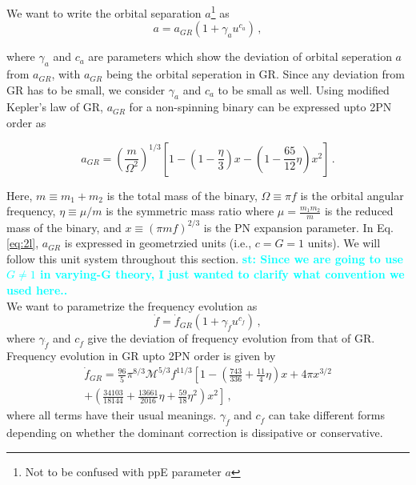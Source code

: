 \documentclass[11pt]{article}
\newcommand{\st}[1]{\textcolor{cyan}{\textbf{st: #1}} }
\begin{document}
 \hspace*{15.5pt}We want to write the orbital separation $a$\footnote{Not to be confused with ppE parameter $a$} as
 \begin{equation}
 \label{eq:2k}
 a=a_{GR}(1+\gamma_a u^{c_a})\,,
 \end{equation}

 where $\gamma_a$ and $c_a$ are parameters which show the deviation of orbital seperation $a$ from $a_{GR}$, with $a_{GR}$ being the orbital seperation in GR. Since any deviation from GR has to be small, we consider $\gamma_a$ and $c_a$ to be small as well. Using modified Kepler's law of GR, $a_{GR}$ for a non-spinning binary can be expressed upto 2PN order as \cite{Blanchet:1995ez} \cite{Blanchet:2013haa}
 
 \begin{equation}\label{eq:2l}
 a_{GR}=\left(\frac{m}{\Omega^2}\right)^{1/3}\left[1-\left(1-\frac{\eta}{3}\right)x-\left(1-\frac{65}{12}\eta\right)x^2\right]\,.
 \end{equation}
 
 Here, $m\equiv m_1+m_2$ is the total mass of the binary, $\Omega\equiv\pi f $ is the orbital angular frequency, $\eta\equiv\mu/m$ is the symmetric mass ratio where $\mu=\frac{m_1m_2}{m}$ is the reduced mass of the binary, and $x\equiv (\pi m f)^{2/3}$ is the PN expansion parameter. In Eq. \eqref{eq:2l}, $a_{GR}$ is expressed in geometrzied units (i.e., $c=G=1$ units). We will follow this unit system throughout this section. \st{Since we are going to use $G\neq 1$ in varying-G theory, I just wanted to clarify what convention we used here..}\\
 
 We want to parametrize the frequency evolution as
\begin{equation}\label{eq:2m}
\dot{f}=\dot{f}_{GR}\left(1+\gamma_{\dot{f}}u^{c_{\dot{f}}}\right)\,,
\end{equation}
where $\gamma_{\dot{f}}$ and $c_{\dot{f}}$ give the deviation of frequency evolution from that of GR. Frequency evolution in GR upto 2PN order is given by \cite{Blanchet:1995ez}
\begin{align}
\dot{f}_{GR}=\frac{96}{5}\pi^{8/3}\mathcal{M}^{5/3}f^{11/3}\left[1-\left(\frac{743}{336}+\frac{11}{4}\eta\right)x+4\pi x^{3/2}\right. \nonumber\\ \left. +\left(\frac{34103}{18144}+\frac{13661}{2016}\eta+\frac{59}{18}\eta^2\right)x^2 \right]\,,
\end{align}
where all terms have their usual meanings. $\gamma_{\dot{f}}$ and $c_{\dot{f}}$ can take different forms depending on whether the dominant correction is dissipative or conservative.
 
\end{document}
